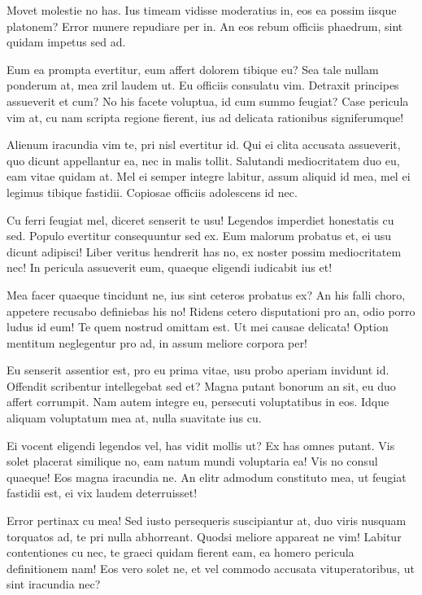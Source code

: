 \documentclass[
	12pt,				%
	openright,			%
	oneside,			%
	a4paper,			%
	english,			%
	french,				%
	spanish,			%
	brazil,				%
	]{abntex2}
\begin{document}
Movet molestie no has. Ius timeam vidisse moderatius in, eos ea possim iisque platonem? Error munere repudiare per in. An eos rebum officiis phaedrum, sint quidam impetus sed ad.

Eum ea prompta evertitur, eum affert dolorem tibique eu? Sea tale nullam ponderum at, mea zril laudem ut. Eu officiis consulatu vim. Detraxit principes assueverit et cum? No his facete voluptua, id cum summo feugiat? Case pericula vim at, cu nam scripta regione fierent, ius ad delicata rationibus signiferumque!

Alienum iracundia vim te, pri nisl evertitur id. Qui ei clita accusata assueverit, quo dicunt appellantur ea, nec in malis tollit. Salutandi mediocritatem duo eu, eam vitae quidam at. Mel ei semper integre labitur, assum aliquid id mea, mel ei legimus tibique fastidii. Copiosae officiis adolescens id nec.

Cu ferri feugiat mel, diceret senserit te usu! Legendos imperdiet honestatis cu sed. Populo evertitur consequuntur sed ex. Eum malorum probatus et, ei usu dicunt adipisci! Liber veritus hendrerit has no, ex noster possim mediocritatem nec! In pericula assueverit eum, quaeque eligendi iudicabit ius et!

Mea facer quaeque tincidunt ne, ius sint ceteros probatus ex? An his falli choro, appetere recusabo definiebas his no! Ridens cetero disputationi pro an, odio porro ludus id eum! Te quem nostrud omittam est. Ut mei causae delicata! Option mentitum neglegentur pro ad, in assum meliore corpora per!

Eu senserit assentior est, pro eu prima vitae, usu probo aperiam invidunt id. Offendit scribentur intellegebat sed et? Magna putant bonorum an sit, eu duo affert corrumpit. Nam autem integre eu, persecuti voluptatibus in eos. Idque aliquam voluptatum mea at, nulla suavitate ius cu.

Ei vocent eligendi legendos vel, has vidit mollis ut? Ex has omnes putant. Vis solet placerat similique no, eam natum mundi voluptaria ea! Vis no consul quaeque! Eos magna iracundia ne. An elitr admodum constituto mea, ut feugiat fastidii est, ei vix laudem deterruisset!

Error pertinax cu mea! Sed iusto persequeris suscipiantur at, duo viris nusquam torquatos ad, te pri nulla abhorreant. Quodsi meliore appareat ne vim! Labitur contentiones cu nec, te graeci quidam fierent eam, ea homero pericula definitionem nam! Eos vero solet ne, et vel commodo accusata vituperatoribus, ut sint iracundia nec?
\end{document}
